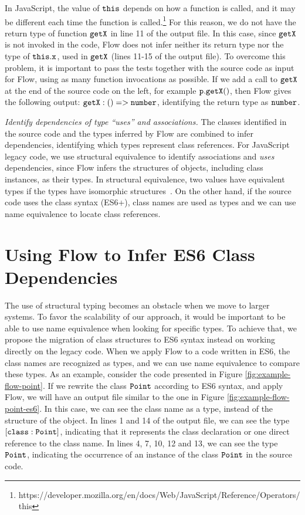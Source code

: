 \documentclass[review]{elsarticle}
\newcommand{\aspas}[1]{{``#1''}}
\newcommand{\mcode}[1]{$\tt #1$}
\begin{document}
In JavaScript, the value of \mcode{this} depends on how a function is called, and it may be different each time the function is called.\footnote{https://developer.mozilla.org/en/docs/Web/JavaScript/Reference/Operators/this}
For this reason, we do not have the return type of function \mcode{getX} in line 11 of the output file. In this case, since \mcode{getX} is not invoked in the code, Flow does not infer neither its return type nor the type of \mcode{this.x}, used in \mcode{getX} (lines 11-15 of the output file). To overcome this problem, it is important to pass the tests together with the source code as input for Flow, using as many function invocations as possible. If we add a call to \mcode{getX} at the end of the source code on the left, for example \mcode{p.getX()}, then Flow gives the following output: \mcode{{getX: ()=> number}}, 
identifying the return type as \mcode{number}.

\vspace{2.0 mm}

\noindent \textit{Identify dependencies of type \aspas{uses} and associations.} The classes identified in the source code and the types inferred by Flow are combined to infer dependencies, identifying which types represent class references. For JavaScript legacy code, we use structural equivalence to identify associations and \textit{uses} dependencies, since Flow infers the structures of objects, including class instances, as their types. In structural equivalence, two values have equivalent types if the types have isomorphic structures~\cite{connor90}. On the other hand, if the source code uses the class syntax (ES6+), class names are used as types and we can use name equivalence to locate class references.


\section{Using Flow to Infer ES6 Class Dependencies}
\label{sec:approach_es6}
The use of structural typing becomes an obstacle when we move to larger systems. To favor the scalability of our approach, it would be important to be able to use name equivalence when looking for specific types. To achieve that, we propose the migration of class structures to ES6 syntax instead on working directly on the legacy code. When we apply Flow to a code written in ES6, the class names are recognized as types, and we can use name equivalence to compare these types. As an example, consider the code presented in Figure \ref{fig:example-flow-point}. If we rewrite the class \mcode{Point} according to ES6 syntax, and apply Flow, we will have an output file similar to the one in Figure \ref{fig:example-flow-point-es6}. In this case, we can see the class name as a type, instead of the structure of the object. In lines 1 and 14 of the output file, we can see the type \mcode{[class: Point]}, indicating that it represents the class declaration or one direct reference to the class name. In lines 4, 7, 10, 12 and 13, we can see the type \mcode{Point}, indicating the occurrence of an instance of the class \mcode{Point} in the source code. 
 
\end{document}
